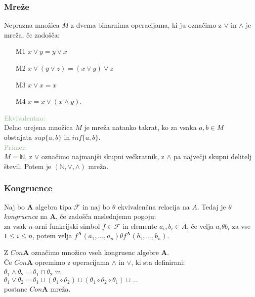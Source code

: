 \documentclass{beamer}
\begin{document}
\begin{frame}
\frametitle{Mreže}
    
    Neprazna množica $M$ z dvema binarnima operacijama, ki ju označimo z $\vee$ in $\wedge$ je mreža, če zadošča:\\
    \begin{enumerate} 
        \item[M1] $x \vee y = y \vee x$
        \item[M2] $x\vee \left(y \vee z\right) = \left(x \vee y\right)\vee z$
        \item[M3] $x \vee x = x$
        \item[M4] $x = x \vee \left(x \wedge y\right)$. \\
    \end{enumerate}
    \pause
    \textcolor{darkseagreen}{Ekvivalentno:} \\
        Delno urejena množica $M$ je mreža natanko takrat, ko za vsaka $a, b \in M$ obstajata $sup\{a, b\}$ 
        in $inf\{a, b\}$.\\
        \textcolor{darkseagreen}{Primer:}\\
    $M = \mathbb{N}$, z $\vee$ označimo najmanjši skupni večkratnik, z $\wedge$ pa največji skupni delitelj
    števil. Potem je $\left(\mathbb{N}, \vee, \wedge\right)$ mreža. 
    
\end{frame}
\begin{frame}
\frametitle{Kongruence}
\begin{block}{}
Naj bo $\mathbf{A}$ algebra tipa $\mathcal{F}$ in naj bo $\theta$ ekvivalenčna relacija na $A$. Tedaj je $\theta$ \emph{kongruenca} 
na $\mathbf{A}$, če zadošča naslednjemu pogoju: \\
za vsak $n$-arni funkcijski simbol $f \in \mathcal{F}$ in elemente $a_i, b_i \in A$, če velja $a_i\theta b_i$ 
za vse $1 \leq i \leq n$, potem velja $f^\mathbf{A}\left(a_1, \dots, a_n\right) \theta 
f^\mathbf{A}\left(b_1, \dots, b_n\right)$.\\
\end{block}

Z $Con \mathbf{A}$ označimo množico vseh kongruenc algebre $\mathbf{A}$.
\\
\pause
Če $Con \mathbf{A}$ opremimo z operacijama $\wedge$ in $\vee$, ki sta definirani:\\
$\theta_1 \wedge \theta_2 = \theta_1 \cap \theta_2$ in \\ 
$\theta_1 \vee \theta_2 = \theta_1 \cup \left(\theta_1 \circ \theta_2\right)
\cup \left(\theta_1 \circ \theta_2 \circ \theta_1\right) \cup \dots$ \\
postane $Con \mathbf{A}$ mreža.
\end{frame}
\end{document}
